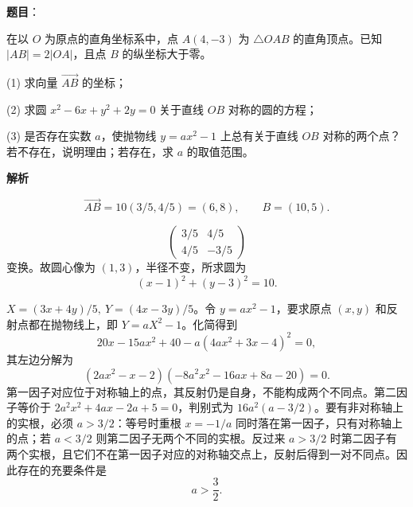 \begin{answer}

\textbf{题目}：

在以 \(O\) 为原点的直角坐标系中，点 \(A(4,-3)\) 为 \(\triangle OAB\) 的直角顶点。已知 \(|AB|=2|OA|\)，且点 \(B\) 的纵坐标大于零。

    (1) 求向量 \(\overrightarrow{AB}\) 的坐标；

    (2) 求圆 \(x^2-6x+y^2+2y=0\) 关于直线 \(OB\) 对称的圆的方程；

    (3) 是否存在实数 \(a\)，使抛物线 \(y=ax^2-1\) 上总有关于直线 \(OB\) 对称的两个点？若不存在，说明理由；若存在，求 \(a\) 的取值范围。

\textbf{解析}

\nopagebreak[4]
\[
\overrightarrow{AB}=10(3/5,4/5)=(6,8),\qquad B=(10,5).
\]

\nopagebreak[4]
\[
\begin{pmatrix}3/5&4/5\\4/5&-3/5\end{pmatrix}
\]
变换。故圆心像为 \((1,3)\)，半径不变，所求圆为
\nopagebreak[4]
\[
(x-1)^2+(y-3)^2=10.
\]

\(X=(3x+4y)/5,\ Y=(4x-3y)/5\)。令 \(y=ax^2-1\)，要求原点 \((x,y)\) 和反射点都在抛物线上，即 \(Y=aX^2-1\)。化简得到
\nopagebreak[4]
\[
20x-15ax^2+40-a(4ax^2+3x-4)^2=0,
\]
其左边分解为
\nopagebreak[4]
\[
(2ax^2-x-2)(-8a^2x^2-16ax+8a-20)=0.
\]
第一因子对应位于对称轴上的点，其反射仍是自身，不能构成两个不同点。第二因子等价于
\(2a^2x^2+4ax-2a+5=0\)，判别式为 \(16a^2(a-3/2)\)。要有非对称轴上的实根，必须 \(a>3/2\)：等号时重根 \(x=-1/a\) 同时落在第一因子，只有对称轴上的点；若 \(a<3/2\) 则第二因子无两个不同的实根。反过来 \(a>3/2\) 时第二因子有两个实根，且它们不在第一因子对应的对称轴交点上，反射后得到一对不同点。因此存在的充要条件是
\nopagebreak[4]
\[
a>\frac32.
\]




\end{answer}
